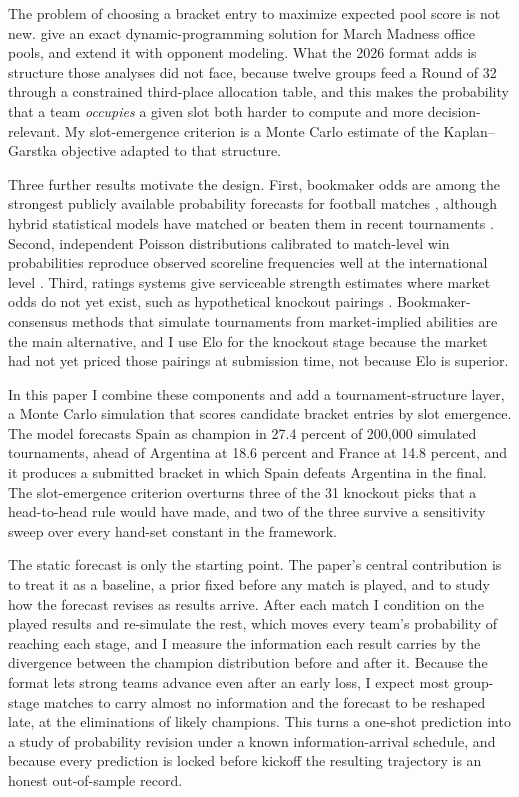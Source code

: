 \documentclass[11pt,a4paper]{article}
\begin{document}
The problem of choosing a bracket entry to maximize expected pool score is not new. \citet{kaplangarstka2001} give an exact dynamic-programming solution for March Madness office pools, and \citet{clairletscher2007} extend it with opponent modeling. What the 2026 format adds is structure those analyses did not face, because twelve groups feed a Round of 32 through a constrained third-place allocation table, and this makes the probability that a team \emph{occupies} a given slot both harder to compute and more decision-relevant. My slot-emergence criterion is a Monte Carlo estimate of the Kaplan--Garstka objective adapted to that structure.

Three further results motivate the design. First, bookmaker odds are among the strongest publicly available probability forecasts for football matches \citep{strumbelj2014, leitner2010}, although hybrid statistical models have matched or beaten them in recent tournaments \citep{groll2018, groll2019}. Second, independent Poisson distributions calibrated to match-level win probabilities reproduce observed scoreline frequencies well at the international level \citep{maher1982, dixoncoles1997}. Third, ratings systems give serviceable strength estimates where market odds do not yet exist, such as hypothetical knockout pairings \citep{hvattum2010, elo1978, constantinou2019}. Bookmaker-consensus methods that simulate tournaments from market-implied abilities \citep{zeileis2018} are the main alternative, and I use Elo for the knockout stage because the market had not yet priced those pairings at submission time, not because Elo is superior.

In this paper I combine these components and add a tournament-structure layer, a Monte Carlo simulation that scores candidate bracket entries by slot emergence. The model forecasts Spain as champion in 27.4 percent of 200{,}000 simulated tournaments, ahead of Argentina at 18.6 percent and France at 14.8 percent, and it produces a submitted bracket in which Spain defeats Argentina in the final. The slot-emergence criterion overturns three of the 31 knockout picks that a head-to-head rule would have made, and two of the three survive a sensitivity sweep over every hand-set constant in the framework.

The static forecast is only the starting point. The paper's central contribution is to treat it as a baseline, a prior fixed before any match is played, and to study how the forecast revises as results arrive. After each match I condition on the played results and re-simulate the rest, which moves every team's probability of reaching each stage, and I measure the information each result carries by the divergence between the champion distribution before and after it. Because the format lets strong teams advance even after an early loss, I expect most group-stage matches to carry almost no information and the forecast to be reshaped late, at the eliminations of likely champions. This turns a one-shot prediction into a study of probability revision under a known information-arrival schedule, and because every prediction is locked before kickoff the resulting trajectory is an honest out-of-sample record.
\end{document}
